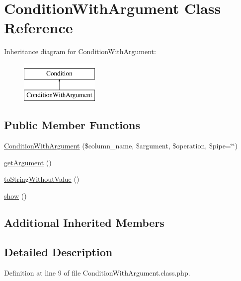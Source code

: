 \hypertarget{classConditionWithArgument}{\section{Condition\-With\-Argument Class Reference}
\label{classConditionWithArgument}
}
Inheritance diagram for Condition\-With\-Argument\-:\begin{figure}[H]
\begin{center}
\leavevmode
\includegraphics[height=2.000000cm]{classConditionWithArgument}
\end{center}
\end{figure}
\subsection*{Public Member Functions}
\begin{DoxyCompactItemize}
\item 
\hyperlink{classConditionWithArgument_a2e5d396e44a1082e6a88ac52e8c5e63d}{Condition\-With\-Argument} (\$column\-\_\-name, \$argument, \$operation, \$pipe=\char`\"{}\char`\"{})
\item 
\hyperlink{classConditionWithArgument_a58a782b4a1f7eb6fd802f8b49750aeb7}{get\-Argument} ()
\item 
\hyperlink{classConditionWithArgument_adf2841f219b6bf3b96414c2c6100ce6c}{to\-String\-Without\-Value} ()
\item 
\hyperlink{classConditionWithArgument_a1624017983d96c85a7fc0b2a986b6e25}{show} ()
\end{DoxyCompactItemize}
\subsection*{Additional Inherited Members}


\subsection{Detailed Description}


Definition at line 9 of file Condition\-With\-Argument.\-class.\-php.



